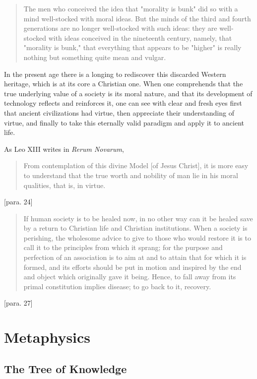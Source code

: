 \documentclass[letterpaper]{article}
\begin{document}
\begin{quote}
  The men who conceived the idea that "morality is bunk" did so with a mind well-stocked with moral ideas. But the minds of the third and fourth generations are no longer well-stocked with such ideas: they are well-stocked with ideas conceived in the nineteenth century, namely, that "morality is bunk," that everything that appears to be "higher" is really nothing but something quite mean and vulgar.
\end{quote}

In the present age there is a longing to rediscover this discarded Western heritage, which is at its core a Christian one. When one comprehends that the true underlying value of a society is its moral nature, and that its development of technology reflects and reinforces it, one can see with clear and fresh eyes first that ancient civilizations had virtue, then appreciate their understanding of virtue, and finally to take this eternally valid paradigm and apply it to ancient life.

As Leo XIII writes in \textit{Rerum Novarum},

\begin{quote}
  From contemplation of this divine Model [of Jesus Christ], it is more easy to understand that the true worth and nobility of man lie in his moral qualities, that is, in virtue.
\end{quote} [para. 24]

\begin{quote}
  If human society is to be healed now, in no other way can it be healed save by a return to Christian life and Christian institutions. When a society is perishing, the wholesome advice to give to those who would restore it is to call it to the principles from which it sprang; for the purpose and perfection of an association is to aim at and to attain that for which it is formed, and its efforts should be put in motion and inspired by the end and object which originally gave it being. Hence, to fall away from its primal constitution implies disease; to go back to it, recovery.
\end{quote} [para. 27]

\section{Metaphysics}

\subsection{The Tree of Knowledge}
\end{document}

